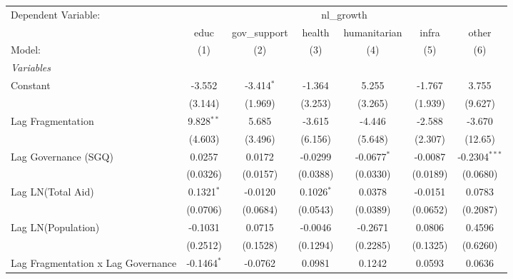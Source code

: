 \par\endgroup



\begingroup
\centering
\begin{tabular}{lcccccc}
   \tabularnewline \midrule \midrule
   Dependent Variable: & \multicolumn{6}{c}{nl\_growth}\\
                                      & educ          & gov\_support  & health       & humanitarian  & infra    & other \\   
   Model:                             & (1)           & (2)           & (3)          & (4)           & (5)      & (6)\\  
   \midrule
   \emph{Variables}\\
   Constant                           & -3.552        & -3.414$^{*}$  & -1.364       & 5.255         & -1.767   & 3.755\\   
                                      & (3.144)       & (1.969)       & (3.253)      & (3.265)       & (1.939)  & (9.627)\\   
   Lag Fragmentation                  & 9.828$^{**}$  & 5.685         & -3.615       & -4.446        & -2.588   & -3.670\\   
                                      & (4.603)       & (3.496)       & (6.156)      & (5.648)       & (2.307)  & (12.65)\\   
   Lag Governance (SGQ)               & 0.0257        & 0.0172        & -0.0299      & -0.0677$^{*}$ & -0.0087  & -0.2304$^{***}$\\   
                                      & (0.0326)      & (0.0157)      & (0.0388)     & (0.0330)      & (0.0189) & (0.0680)\\   
   Lag LN(Total Aid)                  & 0.1321$^{*}$  & -0.0120       & 0.1026$^{*}$ & 0.0378        & -0.0151  & 0.0783\\   
                                      & (0.0706)      & (0.0684)      & (0.0543)     & (0.0389)      & (0.0652) & (0.2087)\\   
   Lag LN(Population)                 & -0.1031       & 0.0715        & -0.0046      & -0.2671       & 0.0806   & 0.4596\\   
                                      & (0.2512)      & (0.1528)      & (0.1294)     & (0.2285)      & (0.1325) & (0.6260)\\   
   Lag Fragmentation x Lag Governance & -0.1464$^{*}$ & -0.0762       & 0.0981       & 0.1242        & 0.0593   & 0.0636\\   

\end{tabular}

